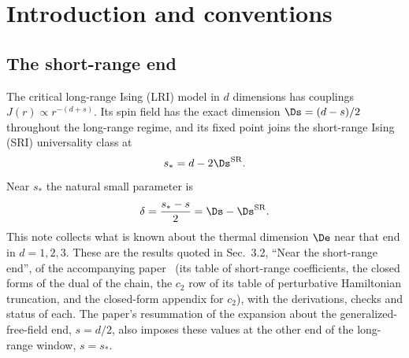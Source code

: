 \begin{abstract}
linear sum of systematic diagnostics; its relative difference from the closed form is $\sci{1.9}{-4}$. In $d=3$,
$c_1=0.2732$, with the estimated range $[0.2690,0.2760]$, conditional on assumed gaps in the omitted spectrum and on
assumed ranges of the input data. Every
result carries its status word and caveats. The appendices give in full the derivations, proofs, methods and checks
of the supplied packages behind these results (the independent re-derivation, the Monte Carlo and the cylinder
continuum analysis are described in the main text), including the formal arguments that two couplings close under renormalization of the dual and
that its prescription extracts the local beta functions. Appendix~\ref{sri:app:repro} maps each number to the package and
command that reproduce it, and a last appendix gives the magnetization-scheme calculation of $\CSR_8$ that the paper
quotes.
\end{abstract}

\clearpage
\setcounter{tocdepth}{2}
\begingroup\small\endgroup
\clearpage

\section{Introduction and conventions}\label{sri:sec:intro}
\subsection{The short-range end}
The critical long-range Ising (LRI) model in $d$ dimensions has couplings $J(r)\propto r^{-(d+s)}$. Its spin field has
the exact dimension $\Ds=(d-s)/2$ throughout the long-range regime, and its fixed point joins the short-range Ising
(SRI) universality class at
\begin{equation}
 s_*=d-2\Ds^{\rm SR}.
\end{equation}
Near $s_*$ the natural small parameter is
\begin{equation}
 \delta=\frac{s_*-s}{2}=\Ds-\Ds^{\rm SR}.
 \label{sri:eq:delta}
\end{equation}
This note collects what is known about the thermal dimension $\De$ near that end in $d=1,2,3$. These are the results
quoted in Sec.~3.2, ``Near the short-range end'', of the accompanying paper~\cite{sri:Paper} (its table of short-range
coefficients, the closed forms of the dual of the chain, the $c_2$ row of its table of perturbative Hamiltonian
truncation, and the closed-form appendix for $c_2$), with the derivations, checks and status of each. The paper's
resummation of the expansion about the generalized-free-field end, $s=d/2$, also imposes these values at the other
end of the long-range window, $s=s_*$.

